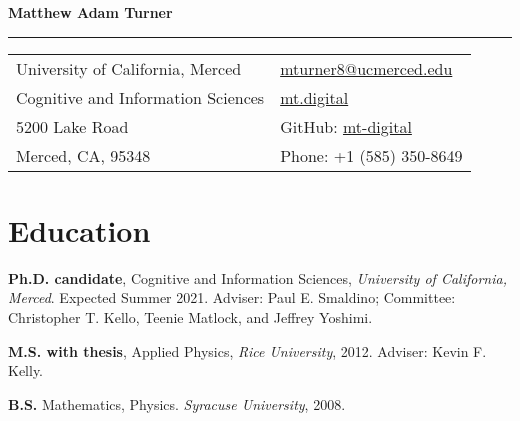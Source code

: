 \documentclass[letterpaper,11pt,oneside]{article}
\begin{document}

\noindent  \textcolor{gunmetal}{\LARGE{\textbf{Matthew Adam Turner}}} \\
\vspace{-2ex}
\hrule 
\normalsize


\begin{center}
\begin{tabular}{l l}
 University of California, Merced & \hspace{1in} \href{mailto:mturner8@ucmerced.edu}{mturner8@ucmerced.edu} \\
 Cognitive and Information Sciences    & \hspace{1in}  \href{http://mt.digital}{mt.digital}   \\
  5200 Lake Road             & \hspace{1in} GitHub: \href{https://github.com/mt-digital}{mt-digital}  \\
 Merced, CA, 95348 & \hspace{1in} Phone: +1 (585) 350-8649 \\
\end{tabular}
\end{center}


\section*{\textcolor{gunmetal}{Education}}

  \begin{hangparas}{0.25in}{1}

    \textbf{Ph.D. candidate}, Cognitive and Information 
      Sciences, \emph{University of California, Merced}. Expected Summer 2021. Adviser: Paul E. Smaldino; Committee:
    Christopher T. Kello, Teenie Matlock, and Jeffrey Yoshimi.

    \textbf{M.S. with thesis}, Applied Physics, \emph{Rice University}, 2012. Adviser: 
      Kevin F. Kelly.

    \textbf{B.S.} Mathematics, Physics. \emph{Syracuse University}, 2008.
  \end{hangparas}
\end{document}
